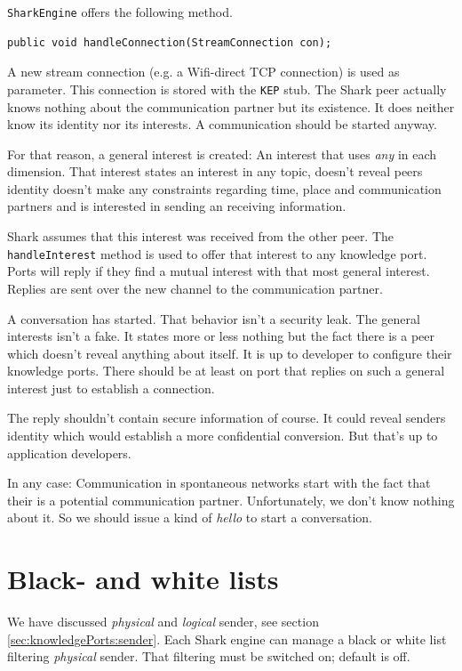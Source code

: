 {\tt SharkEngine} offers the following method.

\begin{verbatim}
public void handleConnection(StreamConnection con);
\end{verbatim}

A new stream connection (e.g. a Wifi-direct TCP connection) is used as parameter. This connection is stored with the {\tt KEP} stub. The Shark peer actually knows nothing about the communication partner but its existence. It does neither know its identity nor its interests. A communication should be started anyway.

For that reason, a general interest is created: An interest that uses {\it any} in each dimension. That interest states an interest in any topic, doesn't reveal peers identity doesn't make any constraints regarding time, place and communication partners and is interested in sending an receiving information.

Shark assumes that this interest was received from the other peer. The {\tt handleInterest} method is used to offer that interest to any knowledge port. Ports will reply if they find a mutual interest with that most general interest. Replies are sent over the new channel to the communication partner.

A conversation has started. That behavior isn't a security leak. The general interests isn't a fake. It states more or less nothing but the fact there is a peer which doesn't reveal anything about itself. It is up to developer to configure their knowledge ports. There should be at least on port that replies on such a general interest just to establish a connection.

The reply shouldn't contain secure information of course. It could reveal senders identity which would establish a more confidential conversion. 
But that's up to application developers.

In any case: Communication in spontaneous networks start with the fact that their is a potential communication partner. Unfortunately, we don't know nothing about it. So we should issue a kind of {\it hello} to start a conversation.

\section{Black- and white lists}
We have discussed {\it physical} and {\it logical} sender, see section \ref{sec:knowledgePorts:sender}. Each Shark engine can manage a black or white list filtering {\it physical} sender. That filtering must be switched on; default is off.

